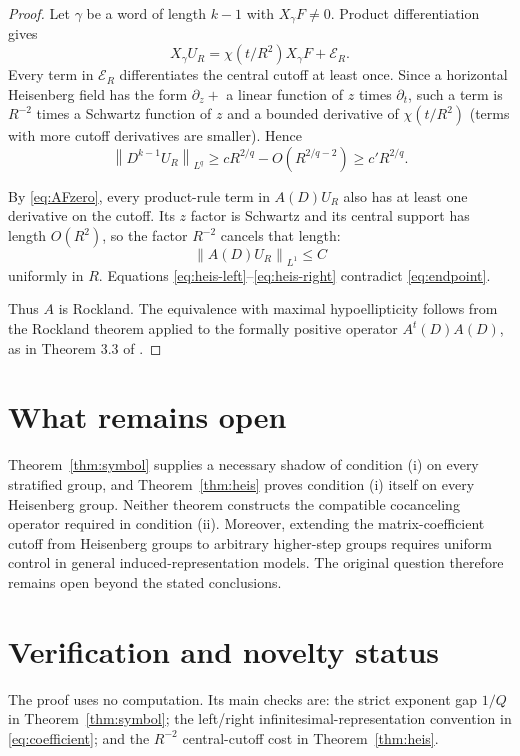 \documentclass[11pt]{article}
\newcommand{\norm}[1]{\left\lVert#1\right\rVert}
\begin{document}
\begin{proof}
Let $\gamma$ be a word of length $k-1$ with $X_\gamma F\ne0$.  Product
differentiation gives
\[
 X_\gamma U_R=\chi(t/R^2)X_\gamma F+\mathcal E_R.
\]
Every term in $\mathcal E_R$ differentiates the central cutoff at least once.
Since a horizontal Heisenberg field has the form $\partial_z+$ a linear
function of $z$ times $\partial_t$, such a term is $R^{-2}$ times a Schwartz
function of $z$ and a bounded derivative of $\chi(t/R^2)$ (terms with more
cutoff derivatives are smaller).  Hence
\begin{equation}\label{eq:heis-left}
 \norm{D^{k-1}U_R}_{L^q}
 \ge cR^{2/q}-O(R^{2/q-2})\ge c'R^{2/q}.
\end{equation}

By \eqref{eq:AFzero}, every product-rule term in $A(D)U_R$ also has at least
one derivative on the cutoff.  Its $z$ factor is Schwartz and its central
support has length $O(R^2)$, so the factor $R^{-2}$ cancels that length:
\begin{equation}\label{eq:heis-right}
 \norm{A(D)U_R}_{L^1}\le C
\end{equation}
uniformly in $R$.  Equations \eqref{eq:heis-left}--\eqref{eq:heis-right}
contradict \eqref{eq:endpoint}.

Thus $A$ is Rockland.  The equivalence with maximal hypoellipticity follows
from the Rockland theorem applied to the formally positive operator
$A^t(D)A(D)$, as in Theorem 3.3 of \cite{VSY}.
\end{proof}

\section{What remains open}

Theorem~\ref{thm:symbol} supplies a necessary shadow of condition (i) on
every stratified group, and Theorem~\ref{thm:heis} proves condition (i) itself
on every Heisenberg group.  Neither theorem constructs the compatible
cocanceling operator required in condition (ii).  Moreover, extending the
matrix-coefficient cutoff from Heisenberg groups to arbitrary higher-step
groups requires uniform control in general induced-representation models.
The original question therefore remains open beyond the stated conclusions.

\section{Verification and novelty status}

The proof uses no computation.  Its main checks are: the strict exponent gap
$1/Q$ in Theorem~\ref{thm:symbol}; the left/right infinitesimal-representation
convention in \eqref{eq:coefficient}; and the $R^{-2}$ central-cutoff cost in
Theorem~\ref{thm:heis}.
\end{document}
